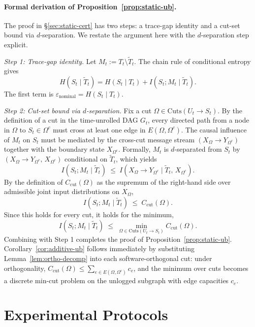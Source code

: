 \documentclass{article}
\begin{document}
  \paragraph{Formal derivation of Proposition~\ref{prop:static-ub}.}
  The proof in \S\ref{sec:static-cert} has two steps: a trace-gap identity and a
   cut-set bound via $d$-separation. We restate the argument here with the
  $d$-separation step explicit.

  \emph{Step 1: Trace-gap identity.} Let $M_t := T_t \setminus \tilde T_t$. The
  chain rule of conditional entropy gives 
  \[
    H(S_t \mid \tilde T_t) = H(S_t \mid T_t) + I(S_t; M_t \mid \tilde T_t).
  \]
  The first term is $\varepsilon_\text{nominal} = H(S_t \mid T_t)$.

  \emph{Step 2: Cut-set bound via $d$-separation.} Fix a cut $\Omega \in
  \mathrm{Cuts}(U_t \to S_t)$. By the definition of a cut in the time-unrolled
  DAG $G_t$, every directed path from a node in $\Omega$ to $S_t \in \Omega^c$
  must cross at least one edge in $E(\Omega, \Omega^c)$. The causal influence of
   $M_t$ on $S_t$ must be mediated by the cross-cut message stream $(X_\Omega
  \to Y_{\Omega^c})$ together with the boundary state $X_{\Omega^c}$. Formally,
  $M_t$ is $d$-separated from $S_t$ by $(X_\Omega \to Y_{\Omega^c},\,
  X_{\Omega^c})$ conditional on $\tilde T_t$, which yields
  \[
    I(S_t; M_t \mid \tilde T_t) \;\leq\; I\!\left(X_\Omega \to Y_{\Omega^c}
  \;\Big|\; \tilde T_t,\, X_{\Omega^c}\right).
  \]
  By the definition of $C_\text{cut}(\Omega)$ as the supremum of the right-hand
  side over admissible joint input distributions on $X_\Omega$,
  \[
    I(S_t; M_t \mid \tilde T_t) \;\leq\; C_\text{cut}(\Omega).
  \]
  Since this holds for every cut, it holds for the minimum,
  \[
    I(S_t; M_t \mid \tilde T_t) \;\leq\; \min_{\Omega \in \mathrm{Cuts}(U_t \to
  S_t)} C_\text{cut}(\Omega).
  \]
  Combining with Step 1 completes the proof of Proposition~\ref{prop:static-ub}.
   Corollary~\ref{cor:additive-ub} follows immediately by substituting
  Lemma~\ref{lem:ortho-decomp} into each software-orthogonal cut: under
  orthogonality, $C_\text{cut}(\Omega) \leq \sum_{e \in E(\Omega, \Omega^c)}
  c_e$, and the minimum over cuts becomes a discrete min-cut problem on the
  unlogged subgraph with edge capacities $c_e$.

  \section{Experimental Protocols}
  \label{app:methodology}
\end{document}
